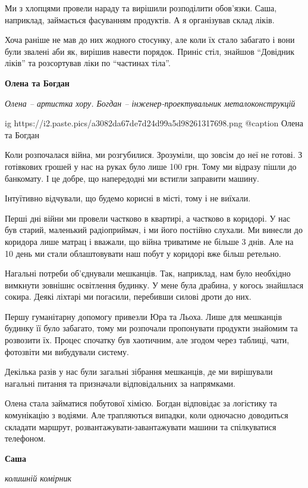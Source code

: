 \begin{multicols}{3}
Ми з хлопцями провели нараду та вирішили розподілити обов'язки. Саша,
наприклад, займається фасуванням продуктів. А я організував склад ліків.

Хоча раніше не мав до них жодного стосунку, але коли їх стало забагато і вони
були звалені аби як, вирішив навести порядок. Приніс стіл, знайшов
\enquote{Довідник ліків} та розсортував ліки по \enquote{частинах тіла}.

\textbf{Олена та Богдан}

\emph{Олена – артистка хору. Богдан – інженер-проектувальник металоконструкцій}

\ifcmt
  ig https://i2.paste.pics/a3082da67de7d24d99a5d98261317698.png
	@caption Олена та Богдан
\fi

Коли розпочалася війна, ми розгубилися. Зрозуміли, що зовсім до неї не готові.
З готівкових грошей у нас на руках було лише 100 грн. Тому ми відразу пішли до
банкомату. І це добре, що напередодні ми встигли заправити машину.

Інтуїтивно відчували, що будемо корисні в місті, тому і не виїхали.

Перші дні війни ми провели частково в квартирі, а частково в коридорі. У нас
був старий, маленький радіоприймач, і ми його постійно слухали. Ми винесли до
коридора лише матрац і вважали, що війна триватиме не більше 3 днів.  Але на 10
день ми стали облаштовувати наш побут у коридорі вже більш ретельно.

Нагальні потреби об'єднували мешканців. Так, наприклад, нам було необхідно
вимкнути зовнішнє освітлення будинку. У мене була драбина, у когось знайшлася
сокира. Деякі ліхтарі ми погасили, перебивши силові дроти до них.

Першу гуманітарну допомогу привезли Юра та Льоха. Лише для мешканців будинку її
було забагато, тому ми розпочали пропонувати продукти знайомим та розвозити їх.
Процес спочатку був хаотичним, але згодом через таблиці, чати, фотозвіти ми
вибудували систему.

Декілька разів у нас були загальні зібрання мешканців, де ми вирішували
нагальні питання та призначали відповідальних за напрямками.

Олена стала займатися побутової хімією. Богдан відповідає за логістику та
комунікацію з водіями. Але трапляються випадки, коли одночасно доводиться
складати маршрут, розвантажувати-завантажувати машини та спілкуватися
телефоном.

\textbf{Саша}

\emph{колишній комірник}


\end{multicols}
